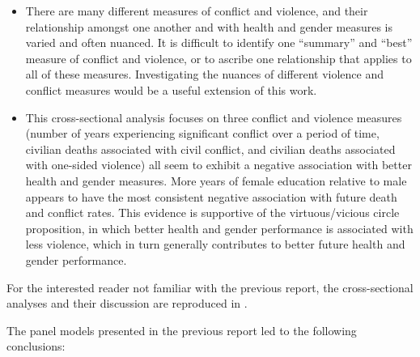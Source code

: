 \documentclass[12pt]{article}
\begin{document}
\begin{itemize}
\item There are many different measures of conflict and violence, and their relationship amongst one another and with health and gender measures is varied and often nuanced. It is difficult to identify one \enquote{summary} and \enquote{best} measure of conflict and violence, or to ascribe one relationship that applies to all of these measures. Investigating the nuances of different violence and conflict measures would be a useful extension of this work.
\item This cross-sectional analysis focuses on three conflict and violence measures (number of years experiencing significant conflict over a period of time, civilian deaths associated with civil conflict, and civilian deaths associated with one-sided violence) all seem to exhibit a negative association with better health and gender measures. More years of female education relative to male appears to have the most consistent negative association with future death and conflict rates. This evidence is supportive of the virtuous/vicious circle proposition, in which better health and gender performance is associated with less violence, which in turn generally contributes to better future health and gender performance.
\end{itemize}

For the interested reader not familiar with the previous report, the cross-sectional analyses and their discussion are reproduced in .

The panel models presented in the previous report led to the following conclusions:
\end{document}
